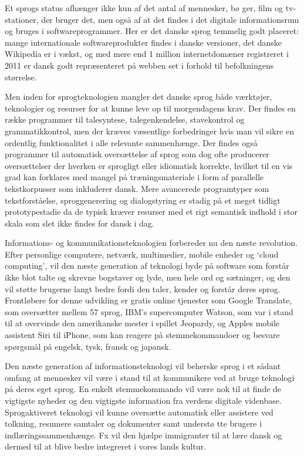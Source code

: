 \begin{multicols}{2}
Et sprogs status afh\ae nger ikke kun af det antal af mennesker, b\o
ger, film og tv-stationer, der bruger det, men \mbox{ogs\aa} af at det
findes i det digitale informationsrum og bruges i softwareprogrammer.
Her er det danske sprog temmelig godt placeret: mange internationale
softwareprodukter findes i danske versioner, det danske Wikipedia er i
v\ae kst, og med mere end 1 million internetdom\ae ner registreret i
2011 er dansk godt repr\ae senteret \mbox{p\aa} webben set i forhold
til befolkningens st\o rrelse.

Men inden for sprogteknologien mangler det danske sprog b\aa de
v\ae rkt\o jer, teknologier og resurser for at kunne leve op til
morgendagens krav. Der findes en r\ae kke programmer til talesyntese,
talegenkendelse, stavekontrol og grammatikkontrol, men der kr\ae ves
v\ae sentlige forbedringer hvis man vil sikre en ordentlig funktionalitet
i alle relevante sammenh\ae nge. Der findes \mbox{ogs\aa} programmer til
automatisk overs\ae ttelse af sprog som dog ofte producerer overs\ae ttelser
der hverken er sprogligt eller idiomatisk korrekte, hvilket til en vis
grad kan forklares med mangel \mbox{p\aa} tr\ae ningsmateriale i form af
parallelle tekstkorpusser som inkluderer dansk. Mere avancerede
programtyper som tekstforst\aa else, sproggenerering og dialogstyring er
stadig \mbox{p\aa} et meget tidligt prototypestadie da de typisk kr\ae ver
resurser med et rigt semantisk indhold i stor skala som slet ikke
findes for dansk i dag.

Informations- og kommunikationsteknologien forbereder nu den n\ae ste
revolution. Efter personlige computere, netv\ae rk, multimedier,
mobile enheder og `cloud computing', vil den n\ae ste generation af
teknologi byde \mbox{p\aa} software som forst\aa r ikke blot talte og
skrevne bogstaver og lyde, men hele ord og s\ae tninger, og den vil
st\o tte brugerne langt bedre fordi den taler, kender og forst\aa r
deres sprog. Frontl\o bere for denne udvikling er gratis online
tjenester som Google Translate, som overs\ae tter mellem 57 sprog,
IBM's supercomputer Watson, som var i stand til at overvinde den
amerikanske mester i spillet Jeopardy, og Apples mobile assistent Siri
til iPhone, som kan reagere \mbox{p\aa} stemmekommandoer og besvare
sp\o rgsm\aa l \mbox{p\aa} engelsk, tysk, fransk og japansk.

Den n\ae ste generation af informationsteknologi vil beherske sprog i
et s\aa dant omfang at mennesker vil v\ae re i stand til at
kommunikere ved at bruge teknologi \mbox{p\aa} deres eget sprog.  En
enkelt stemmekommando vil v\ae re nok til at finde de vigtigste
nyheder og den vigtigste information fra verdens digitale videnbase.
Sprogaktiveret teknologi vil kunne overs\ae tte automatisk eller
assistere ved tolkning, resumere samtaler og dokumenter samt underst\o
tte brugere i indl\ae ringssammenh\ae nge. Fx vil den hj\ae lpe
immigranter til at l\ae re dansk og dermed til at blive bedre
integreret i vores lands kultur.


\end{multicols}
